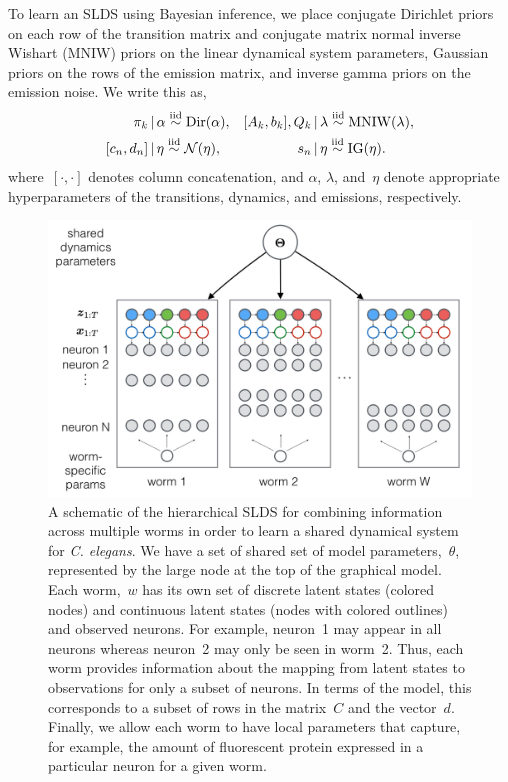 \documentclass{article}
\newcommand{\celegans}{\textit{C. elegans}}
\begin{document}
To learn an SLDS using Bayesian inference, we place conjugate Dirichlet priors
on each row of the transition matrix and conjugate matrix normal
inverse Wishart (MNIW) priors on the linear dynamical system parameters,
Gaussian priors on the rows of the emission matrix,
and inverse gamma priors on the emission noise.
We write this as,
\begin{align*}
  \pi_k &\,|\, \alpha \stackrel{\text{iid}}{\sim} \mathrm{Dir}(\alpha),
  &
  [A_k, b_k], Q_k &\,|\, \lambda \stackrel{\text{iid}}{\sim} \mathrm{MNIW}(\lambda),
  \\
  [c_n, d_n] &\,|\, \eta \stackrel{\text{iid}}{\sim} \mathcal{N}(\eta),
  &
  s_{n} &\,|\, \eta \stackrel{\text{iid}}{\sim} \mathrm{IG}(\eta).
\end{align*}
where~$[\cdot, \cdot]$ denotes column concatenation, and $\alpha$, $\lambda$,
and~$\eta$ denote appropriate hyperparameters of the transitions, dynamics, and
emissions, respectively.

\begin{figure}[t]
\centering%
\includegraphics[width=\textwidth]{figures/hslds.png} 
\caption{A schematic of the hierarchical SLDS for combining information
  across multiple worms in order to learn a shared dynamical system
  for \celegans.  We have a set of shared set of model parameters,~$\theta$,
  represented by the large node at the top of the graphical model. Each
  worm,~$w$ has its own set of discrete latent states (colored nodes)
  and continuous latent states (nodes with colored outlines) and observed neurons.
  For example, neuron~1 may appear in all neurons whereas neuron~2
  may only be seen in worm~2. Thus, each worm provides information
  about the mapping from latent states to observations for only a
  subset of neurons. In terms of the model, this corresponds to a
  subset of rows in the matrix~$C$ and the vector~$d$. Finally,
  we allow each worm to have local parameters that capture, for example,
  the amount of fluorescent protein expressed in a particular neuron
  for a given worm. 
}
\label{fig:hslds}
\end{figure}
\end{document}
